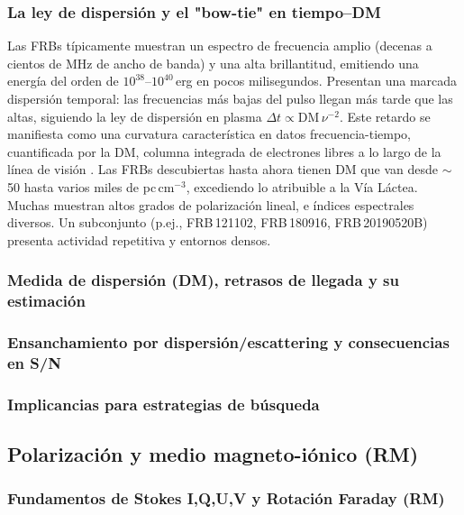 \subsubsection{La ley de dispersión y el "bow-tie" en tiempo--DM}

Las FRBs típicamente muestran un espectro de frecuencia amplio 
(decenas a cientos de MHz de ancho de banda) y una alta brillantitud, emitiendo una energía del orden 
de $10^{38}$--$10^{40}$\,erg en pocos milisegundos. Presentan una marcada dispersión temporal: las 
frecuencias más bajas del pulso llegan más tarde que las altas, siguiendo la ley de dispersión en 
plasma $\Delta t \propto \mathrm{DM}\,\nu^{-2}$. Este retardo se manifiesta como una curvatura 
característica en datos frecuencia-tiempo, cuantificada por la DM, columna integrada de electrones 
libres a lo largo de la línea de visión \citep{LorimerKramer2004}. Las FRBs descubiertas hasta ahora 
tienen DM que van desde $\sim$50 hasta varios miles de pc\,cm$^{-3}$, excediendo lo atribuible a la 
Vía Láctea. Muchas muestran altos grados de polarización lineal, e índices espectrales diversos. 
Un subconjunto (p.ej., FRB\,121102, FRB\,180916, FRB\,20190520B) presenta actividad repetitiva y 
entornos densos.

\subsubsection{Medida de dispersión (DM), retrasos de llegada y su estimación}

\subsubsection{Ensanchamiento por dispersión/escattering y consecuencias en S/N}

\subsubsection{Implicancias para estrategias de búsqueda}

\subsection{Polarización y medio magneto-iónico (RM)}

\subsubsection{Fundamentos de Stokes I,Q,U,V y Rotación Faraday (RM)}

